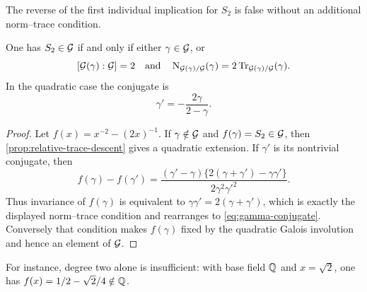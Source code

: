 The reverse of the first individual implication for \(S_2\) is false without
an additional norm--trace condition.

\begin{theorem}
\label{thm:quadratic-descent}
One has \(S_2\in\mathcal G\) if and only if either \(\gamma\in\mathcal G\), or
\[
 [\mathcal G(\gamma):\mathcal G]=2
 \quad\text{and}\quad
 \operatorname{N}_{\mathcal G(\gamma)/\mathcal G}(\gamma)
 =2\operatorname{Tr}_{\mathcal G(\gamma)/\mathcal G}(\gamma).
\]
In the quadratic case the conjugate is
\begin{equation}\label{eq:gamma-conjugate}
 \gamma'=-\frac{2\gamma}{2-\gamma}.
\end{equation}
\end{theorem}

\begin{proof}
Let \(f(x)=x^{-2}-(2x)^{-1}\).  If \(\gamma\notin\mathcal G\) and
\(f(\gamma)=S_2\in\mathcal G\), then \cref{prop:relative-trace-descent} gives a
quadratic extension.  If \(\gamma'\) is its nontrivial conjugate, then
\[
 f(\gamma)-f(\gamma')
 =\frac{(\gamma'-\gamma)
 \{2(\gamma+\gamma')-\gamma\gamma'\}}
 {2\gamma^2{\gamma'}^2}.
\]
Thus invariance of \(f(\gamma)\) is equivalent to
\(\gamma\gamma'=2(\gamma+\gamma')\), which is exactly the displayed
norm--trace condition and rearranges to \eqref{eq:gamma-conjugate}.
Conversely that condition makes \(f(\gamma)\) fixed by the quadratic Galois
involution and hence an element of \(\mathcal G\).
\end{proof}

For instance, degree two alone is insufficient: with base field \(\mathbb Q\) and
\(x=\sqrt2\), one has
\(f(x)=1/2-\sqrt2/4\notin\mathbb Q\).

